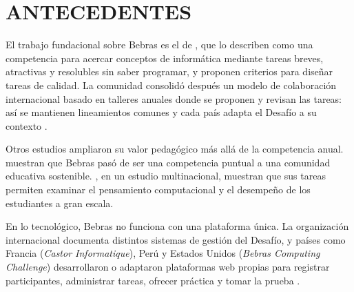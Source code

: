 
\section{ANTECEDENTES}

El trabajo fundacional sobre Bebras es el de \textcite{dagienefutschek2008}, que lo describen como una competencia para acercar conceptos de informática mediante tareas breves, atractivas y resolubles sin saber programar, y proponen criterios para diseñar tareas de calidad. La comunidad consolidó después un modelo de colaboración internacional basado en talleres anuales donde se proponen y revisan las tareas: así se mantienen lineamientos comunes y cada país adapta el Desafío a su contexto \parencite{bebras,bebrastaskworkshops,bebrasstructure}.

Otros estudios ampliaron su valor pedagógico más allá de la competencia anual. \textcite{dagienestupuriene2016} muestran que Bebras pasó de ser una competencia puntual a una comunidad educativa sostenible. \textcite{izumirolo2017}, en un estudio multinacional, muestran que sus tareas permiten examinar el pensamiento computacional y el desempeño de los estudiantes a gran escala.

En lo tecnológico, Bebras no funciona con una plataforma única. La organización internacional documenta distintos sistemas de gestión del Desafío, y países como Francia (\textit{Castor Informatique}), Perú y Estados Unidos (\textit{Bebras Computing Challenge}) desarrollaron o adaptaron plataformas web propias para registrar participantes, administrar tareas, ofrecer práctica y tomar la prueba \parencite{bebrascms,bebrasfrancia,bebrasperu,bebraseeuu}.
\clearpage
